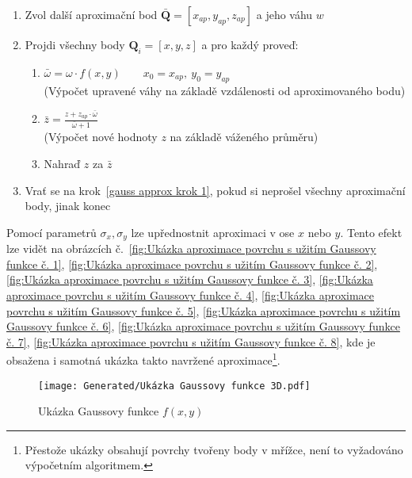 \begin{enumerate}
    \item \label{gauss approx krok 1} Zvol další aproximační bod $\bar{\bm{Q}} = [x_{ap}, y_{ap}, z_{ap}]$ a jeho váhu $w$
    \item Projdi všechny body $\bm{Q}_i = [x,y,z]$ a pro každý proveď:
          \begin{enumerate}
              \item $\bar{\omega} = \omega \cdot f(x, y) \quad \quad x_0 = x_{ap},~y_0 = y_{ap}$\\
                    {\tiny{(Výpočet upravené váhy na základě vzdálenosti od aproximovaného bodu)}}
              \item $\bar{z} = \frac{z + z_{ap} \cdot \bar{\omega} }{\bar{\omega} + 1}$\\
                    {\tiny{(Výpočet nové hodnoty $z$ na základě váženého průměru)}}
              \item Nahraď $z$ za $\bar{z}$
          \end{enumerate}
    \item Vrať se na krok~\ref{gauss approx krok 1}, pokud si neprošel všechny
          aproximační body, jinak konec
\end{enumerate}
Pomocí parametrů $\sigma_x, \sigma_y$ lze upřednostnit aproximaci v ose $x$ nebo $y$. Tento efekt lze vidět na obrázcích
č.~\ref{fig:Ukázka aproximace povrchu s užitím Gaussovy funkce č. 1},
\ref{fig:Ukázka aproximace povrchu s užitím Gaussovy funkce č. 2},
\ref{fig:Ukázka aproximace povrchu s užitím Gaussovy funkce č. 3},
\ref{fig:Ukázka aproximace povrchu s užitím Gaussovy funkce č. 4},
\ref{fig:Ukázka aproximace povrchu s užitím Gaussovy funkce č. 5},
\ref{fig:Ukázka aproximace povrchu s užitím Gaussovy funkce č. 6},
\ref{fig:Ukázka aproximace povrchu s užitím Gaussovy funkce č. 7},
\ref{fig:Ukázka aproximace povrchu s užitím Gaussovy funkce č. 8},
kde je obsažena i samotná ukázka takto navržené aproximace\footnote{Přestože
    ukázky obsahují povrchy tvořeny body v mřížce, není to vyžadováno výpočetním algoritmem.
}.
\begin{figure}[H]
    \centering
    \texttt{[image: Generated/Ukázka Gaussovy funkce 3D.pdf]}
    \caption{Ukázka Gaussovy funkce $f(x,y)$}
    \label{fig:Ukázka Gaussovy funkce 3D}
\end{figure}
